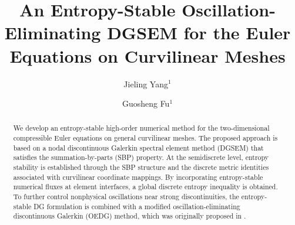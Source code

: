 \documentclass[fleqn,11pt]{amsart}
\title[ES-OEDG]{
An Entropy-Stable Oscillation-Eliminating DGSEM for the Euler Equations on Curvilinear Meshes}
\author{Jieling Yang$^1$}
\author{Guosheng Fu$^1$}
\begin{document}
\maketitle


\begin{abstract}
We develop an entropy-stable high-order numerical method for the
two-dimensional compressible Euler equations on general curvilinear meshes.
The proposed approach is based on a nodal discontinuous Galerkin spectral
element method (DGSEM) that satisfies the summation-by-parts (SBP) property.
At the semidiscrete level, entropy stability is established through the
SBP structure and the discrete metric identities associated with curvilinear
coordinate mappings.
By incorporating entropy-stable numerical fluxes at element interfaces, a
global discrete entropy inequality is obtained.
To further control nonphysical oscillations near strong discontinuities, the
entropy-stable DG formulation is combined with a modified
oscillation-eliminating discontinuous Galerkin (OEDG) method, which was originally proposed in \cite{peng2025oedg}.

\end{abstract}
\end{document}
